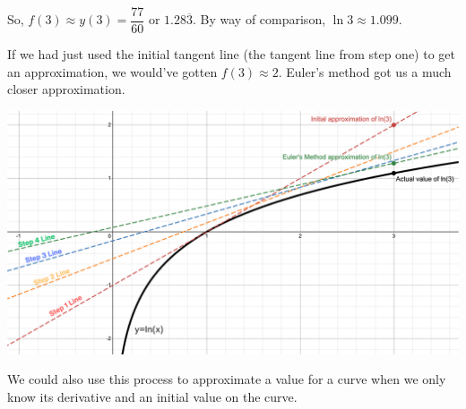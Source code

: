 \begin{tcolorbox}[solution]
    So, $f(3) \approx y(3) = \boxed{\dfrac{77}{60}} \text{ or } \boxed{1.28\overline{3}}$. By way of comparison, $\ln 3 \approx 1.099$. 
\end{tcolorbox}

If we had just used the initial tangent line (the tangent line from step one) to get an approximation, we would've gotten $f(3) \approx 2$. Euler's method got us a much closer approximation. \par

\includegraphics[width=\textwidth]{Support/Chapter 1 Graphics/1.4-Graphic3.png}

We could also use this process to approximate a value for a curve when we only
know its derivative and an initial value on the curve. \par

